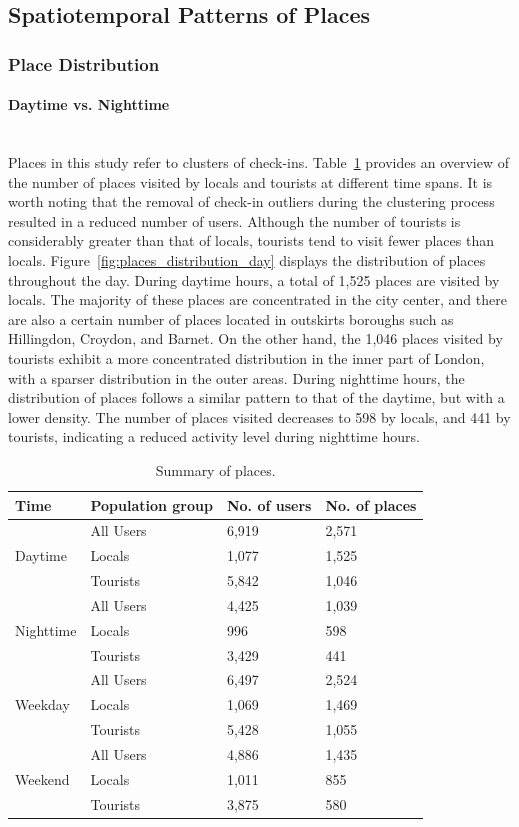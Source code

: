 \documentclass{article}
\newcommand{\subsubsubsection}[1]{\paragraph{#1}\mbox{}\\}
\theoremstyle{remark}
\begin{document}
\subsection{Spatiotemporal Patterns of Places} \label{patterns_places}

\subsubsection{Place Distribution}

\subsubsubsection{Daytime vs. Nighttime}
Places in this study refer to clusters of check-ins. Table~\ref{tab:places_summary} provides an overview of the number of places visited by locals and tourists at different time spans. It is worth noting that the removal of check-in outliers during the clustering process resulted in a reduced number of users. Although the number of tourists is considerably greater than that of locals, tourists tend to visit fewer places than locals. Figure~\ref{fig:places_distribution_day} displays the distribution of places throughout the day. During daytime hours, a total of 1,525 places are visited by locals. The majority of these places are concentrated in the city center, and there are also a certain number of places located in outskirts boroughs such as Hillingdon, Croydon, and Barnet. On the other hand, the 1,046 places visited by tourists exhibit a more concentrated distribution in the inner part of London, with a sparser distribution in the outer areas. During nighttime hours, the distribution of places follows a similar pattern to that of the daytime, but with a lower density. The number of places visited decreases to 598 by locals, and 441 by tourists, indicating a reduced activity level during nighttime hours.


\begin{table}[h!]
\centering
\caption{\label{tab:places_summary}Summary of places.}
\begin{tabular}{llll} \hline
Time & Population group & No. of users & No. of places \\
\hline
\multirow{3}{*}{Daytime} 
& All Users & 6,919 & 2,571 \\
& Locals & 1,077 & 1,525 \\
& Tourists & 5,842 & 1,046 \\
\hline
\multirow{3}{*}{Nighttime} 
& All Users & 4,425 & 1,039 \\
& Locals & 996 & 598 \\
& Tourists & 3,429 & 441 \\
\hline
\multirow{3}{*}{Weekday} 
& All Users & 6,497 & 2,524 \\
& Locals & 1,069 & 1,469 \\
& Tourists & 5,428 & 1,055 \\
\hline
\multirow{3}{*}{Weekend} 
& All Users & 4,886 & 1,435 \\
& Locals & 1,011 & 855 \\
& Tourists & 3,875 & 580 \\
\hline
\end{tabular}
\end{table}
\end{document}
